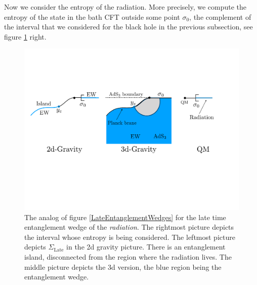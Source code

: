 \documentclass[11pt]{article}
\begin{document}
Now we consider the entropy of the radiation. 
More precisely, we compute the entropy of the state in the bath CFT outside some point $\sigma_0$, the complement of the interval that we considered for the black hole in the previous subsection, see figure \ref{RadiationEW} right.
\begin{figure}[ht]
    \begin{center}
    \includegraphics[scale=.5]{Figures/RadiationEW}
    \end{center}
    \caption{The analog of figure \ref{LateEntanglementWedges} for the late time entanglement wedge of the \emph{radiation}.
     The rightmost picture depicts the interval whose entropy is being considered.
     The leftmost picture depicts $\Sigma_\text{Late}$ in the 2d gravity picture.
     There is an entanglement island, disconnected from the region where the radiation lives. 
     The middle picture depicts the 3d version, the blue region being the entanglement wedge.}
    \label{RadiationEW}
\end{figure}
\end{document}
